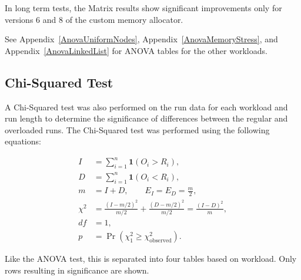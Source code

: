 In long term tests, the Matrix results show significant improvements only for versions 6 and 8 of the custom memory allocator. 

See Appendix~\ref{AnovaUniformNodes}, Appendix~\ref{AnovaMemoryStress}, and Appendix~\ref{AnovaLinkedList} for ANOVA tables for the other workloads.

\subsection{Chi-Squared Test}

A Chi-Squared test was also performed on the run data for each workload and run length to determine the significance of differences between the regular and overloaded runs. The Chi-Squared test was performed using the following equations:

\begin{align}
I &= \sum_{i=1}^{n}\mathbf{1}(O_i>R_i), \\
D &= \sum_{i=1}^{n}\mathbf{1}(O_i<R_i), \\
m &= I+D,\qquad E_I=E_D=\frac{m}{2}, \\
\chi^2
&= \frac{(I-m/2)^2}{m/2}
 + \frac{(D-m/2)^2}{m/2}
 = \frac{(I-D)^2}{m}, \\
df &= 1, \\
p &= \Pr\!\left(\chi^2_1\ge\chi^2_{\mathrm{observed}}\right).
\end{align}

Like the ANOVA test, this is separated into four tables based on workload. Only rows resulting in significance are shown.

